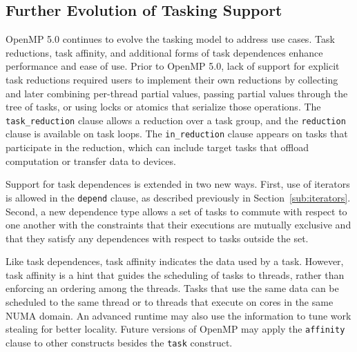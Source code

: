 \subsection{Further Evolution of Tasking Support}
\label{sub:new_tasking}

OpenMP 5.0 continues to evolve the tasking model to address use cases. Task 
reductions, task affinity, and additional forms of task 
dependences enhance performance and ease of use. Prior to OpenMP 5.0, lack 
of support for explicit task reductions required users to implement their 
own reductions by collecting and later combining per-thread partial values, 
passing partial values through the tree of tasks, or using locks or atomics 
that serialize those operations. The \texttt{task\_reduction} clause allows 
a reduction over a task group, and the \texttt{reduction} clause is available 
on task loops. The \texttt{in\_reduction} clause appears on tasks that 
participate in the reduction, which can include target tasks that 
offload computation or transfer data to devices.

Support for task dependences is extended in two new ways.  First, use 
of iterators is allowed in the \texttt{depend} clause, as described 
previously in Section~\ref{sub:iterators}. Second, a new dependence type 
allows a set of tasks to commute with respect to one another with the 
constraints that their executions are mutually exclusive and that 
they satisfy any dependences with respect to tasks outside the set.

Like task dependences, task affinity indicates the data used by a task. 
However, task affinity is a hint that guides the scheduling of tasks to 
threads, rather than enforcing an ordering among the threads. Tasks that 
use the same data can be scheduled to the same thread or to threads that 
execute on cores in the same NUMA domain. An advanced runtime may also use 
the information to tune work stealing for better locality. Future versions 
of OpenMP may apply the \texttt{affinity} clause to other constructs besides 
the \texttt{task} construct.

